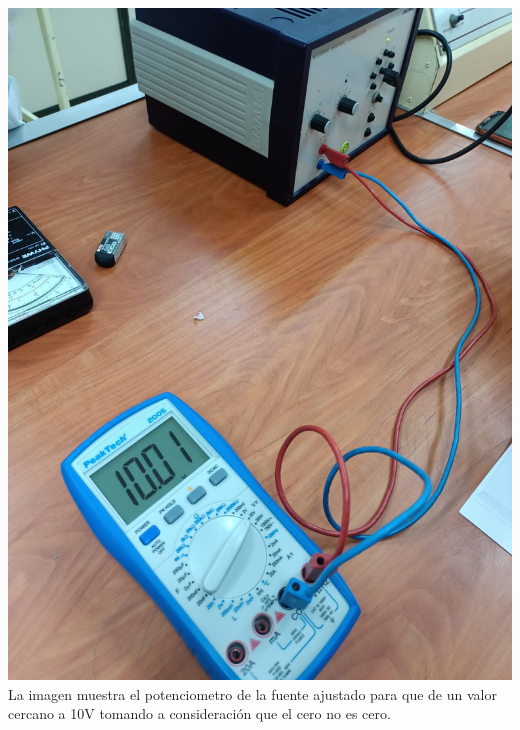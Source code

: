\documentclass[10pt]{article}
\begin{document}
\begin{multicols}{2}
\begin{center}
	\includegraphics[scale = 0.1]{Imagenes/Fotos/Diez.jpeg}\\
	La imagen muestra el potenciometro de la fuente ajustado para que de un valor cercano a 10V tomando a consideración que el cero no es cero.

\end{center}
\end{multicols}
\end{document}
